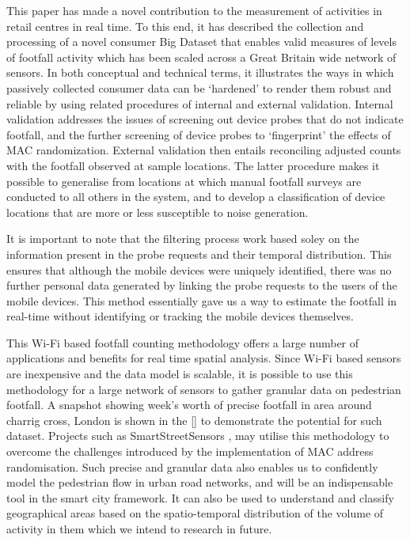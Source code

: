 This paper has made a novel contribution to the measurement of activities in retail centres in real time.
To this end, it has described the collection and processing of a novel consumer Big Dataset that enables valid measures of levels of footfall activity which has been scaled across a Great Britain wide network of sensors.
In both conceptual and technical terms, it illustrates the ways in which passively collected consumer data can be ‘hardened’ to render them robust and reliable by using related procedures of internal and external validation.
Internal validation addresses the issues of screening out device probes that do not indicate footfall, and the further screening of device probes to ‘fingerprint’ the effects of MAC randomization.
External validation then entails reconciling adjusted counts with the footfall observed at sample locations.
The latter procedure makes it possible to generalise from locations at which manual footfall surveys are conducted to all others in the system, and to develop a classification of device locations that are more or less susceptible to noise generation.

It is important to note that the filtering process work based soley on the information present in the probe requests and their temporal distribution.
This ensures that although the mobile devices were uniquely identified, there was no further personal data generated by linking the probe requests to the users of the mobile devices.
This method essentially gave us a way to estimate the footfall in real-time without identifying or tracking the mobile devices themselves. 

This Wi-Fi based footfall counting methodology offers a large number of applications and benefits for real time spatial analysis.
Since Wi-Fi based sensors are inexpensive and the data model is scalable, it is possible to use this methodology for a large network of sensors to gather granular data on pedestrian footfall.
A snapshot showing week's worth of precise footfall in area around charrig cross, London is shown in the \ref{} to demonstrate the potential for such dataset.
Projects such as SmartStreetSensors \citep{sss2016}, may utilise this methodology to overcome the challenges introduced by the implementation of MAC address randomisation.
Such precise and granular data also enables us to confidently model the pedestrian flow in urban road networks, and will be an indispensable tool in the smart city framework.
It can also be used to understand and classify geographical areas based on the spatio-temporal distribution of the volume of activity in them which we intend to research in future.


